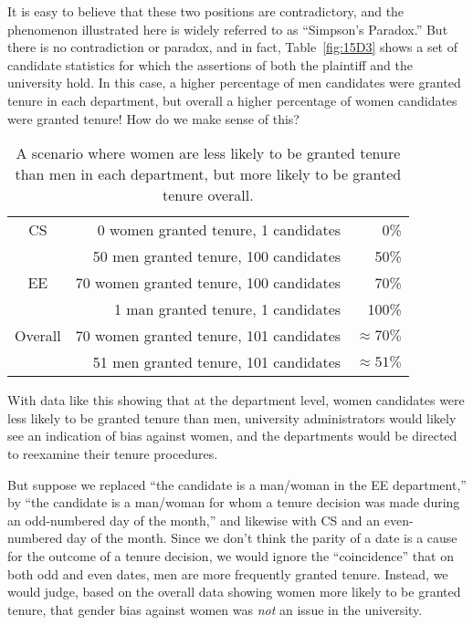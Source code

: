 \begin{editingnotes}
It is easy to believe that these two positions are contradictory, and
the phenomenon illustrated here is widely referred to as ``Simpson's
Paradox.''  But there is no contradiction or paradox, and in fact,
Table~\ref{fig:15D3} shows a set of candidate statistics for which the
assertions of both the plaintiff and the university hold.  In this
case, a higher percentage of men candidates were granted tenure in
each department, but overall a higher percentage of women candidates
were granted tenure!  How do we make sense of this?

\begin{table}

\begin{tabular}{crr}
CS & 0 women granted tenure, 1 candidates      &   0\% \\
   & 50 men granted tenure, 100 candidates     &  50\% \\
EE & 70 women granted tenure, 100 candidates   &  70\% \\
   & 1 man granted tenure, 1 candidates         & 100\% \\
\hline
Overall & 70 women granted tenure, 101 candidates & $\approx 70\%$ \\
        & 51 men granted tenure, 101 candidates   & $\approx 51\%$
\end{tabular}

\caption{A scenario where women are less likely to be granted tenure
  than men in each department, but more likely to be granted tenure
  overall.}

\label{fig:15D3-tenure}

\end{table}

With data like this showing that at the department level, women
candidates were less likely to be granted tenure than men, university
administrators would likely see an indication of bias against women,
and the departments would be directed to reexamine their tenure
procedures.

But suppose we replaced ``the candidate is a man/woman in the EE
department,'' by ``the candidate is a man/woman for whom a tenure
decision was made during an odd-numbered day of the month,'' and
likewise with CS and an even-numbered day of the month.  Since we
don't think the parity of a date is a cause for the outcome of a
tenure decision, we would ignore the ``coincidence'' that on both odd
and even dates, men are more frequently granted tenure.  Instead, we
would judge, based on the overall data showing women more likely to be
granted tenure, that gender bias against women was \emph{not} an issue
in the university.


\end{editingnotes}
